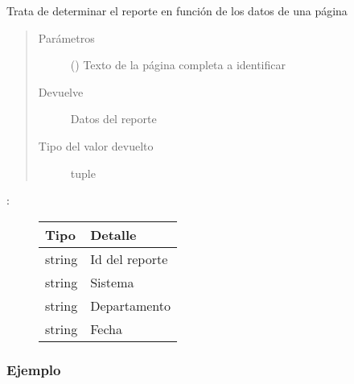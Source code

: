\documentclass[a4paper,12pt,spanish]{sphinxmanual}
\begin{document}
\begin{fulllineitems}
\begin{fulllineitems}
\label{\detokenize{openerm.ReportMatcher:openerm.ReportMatcher.ReportMatcher.match}}
Trata de determinar el reporte en función de los datos de una página
\begin{quote}\begin{description}
\item[{Parámetros}] \leavevmode
{} () \textendash{} Texto de la página completa a identificar

\item[{Devuelve}] \leavevmode
Datos del reporte

\item[{Tipo del valor devuelto}] \leavevmode
tuple

\end{description}\end{quote}
\begin{description}
\item[{:}] \leavevmode

\begin{savenotes}\sphinxattablestart
\centering
\begin{tabulary}{\linewidth}[t]{|T|T|}
\hline
\sphinxstyletheadfamily 
Tipo
&\sphinxstyletheadfamily 
Detalle
\\
\hline
string
&
Id del reporte
\\
\hline
string
&
Sistema
\\
\hline
string
&
Departamento
\\
\hline
string
&
Fecha
\\
\hline
\end{tabulary}
\par
\sphinxattableend\end{savenotes}

\end{description}
\subsubsection*{Ejemplo}

\begin{sphinxVerbatim}[commandchars=\\\{\}]
   
  
\end{sphinxVerbatim}

\end{fulllineitems}


\end{fulllineitems}
\end{document}
